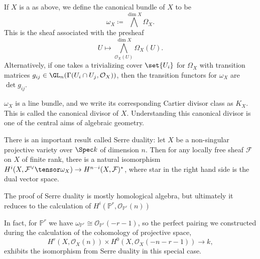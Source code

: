 If $X$ is a as above, we define the canonical bundle of $X$ to be
\[ \omega_X \coloneqq \bigwedge^{\dim X}\Omega_X. \]
This is the sheaf associated with the presheaf
\[ U\mapsto \bigwedge^{\dim X}_{\mathcal{O}_X(U)}\Omega_X(U). \]
Alternatively, if one takes a trivializing cover $\set{U_i}$ for $\Omega_X$ with
transition matrices $g_{ij} \in \GL_n(\Gamma(U_i\cap U_j, \mathcal{O}_X))$,
then the transition functors for $\omega_X$ are $\det g_{ij}$.

$\omega_X$ is a line bundle, and we write its corresponding Cartier divisor
class as $K_X$. This is called the canonical divisor of $X$. Understanding
this canonical divisor is one of the central aims of algebraic geometry.

There is an important result called Serre duality: let $X$ be a non-singular
projective variety over $\Spec k$ of dimension $n$. Then for any locally
free sheaf $\mathcal{F}$ on $X$ of finite rank, there is a natural isomorphism
$H^i(X, \mathcal{F}^{\vee}\tensor \omega_X)\to H^{n-i}(X, \mathcal{F})^*$,
where star in the right hand side is the dual vector space.

The proof of Serre duality is mostly homological algebra, but ultimately it
reduces to the calculation of $H^i(\mathbb{P}^r, \mathcal{O}_{\mathbb{P}^r}(n))$

In fact, for $\mathbb{P}^r$ we have $\omega_{\mathbb{P}^r}\cong \mathcal{O}_{\mathbb{P}^r}(-r-1)$,
so the perfect pairing we constructed during the calculation of the cohomology
of projective space,
\[ H^r(X, \mathcal{O}_X(n))\times H^0(X, \mathcal{O}_X(-n-r-1))\to k, \]
exhibits the isomorphism from Serre duality in this special case.
